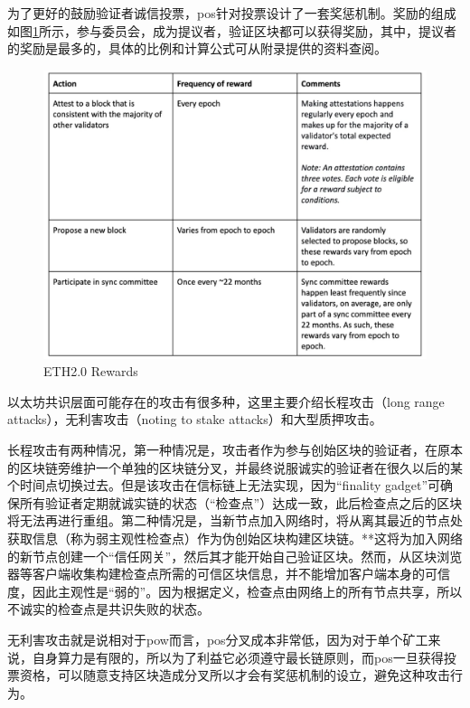 \documentclass[a4paper,twoside]{scrbook}
\begin{document}
\begin{CJK}{UTF8}{gbsn}
为了更好的鼓励验证者诚信投票，pos针对投票设计了一套奖惩机制。奖励的组成如图\ref{fig:reward}所示，参与委员会，成为提议者，验证区块都可以获得奖励，其中，提议者的奖励是最多的，具体的比例和计算公式可从附录提供的资料查阅。

\begin{figure}[!htbp]
\centering
\includegraphics[width=1\textwidth]{Figures/eth reward.png}
\caption{ETH2.0 Rewards} 
\label{fig:reward}
\end{figure}

以太坊共识层面可能存在的攻击有很多种，这里主要介绍长程攻击（long range attacks），无利害攻击（noting to stake attacks）和大型质押攻击。

长程攻击有两种情况，第一种情况是，攻击者作为参与创始区块的验证者，在原本的区块链旁维护一个单独的区块链分叉，并最终说服诚实的验证者在很久以后的某个时间点切换过去。但是该攻击在信标链上无法实现，因为“finality gadget”可确保所有验证者定期就诚实链的状态（“检查点”）达成一致，此后检查点之后的区块将无法再进行重组。第二种情况是，当新节点加入网络时，将从离其最近的节点处获取信息（称为弱主观性检查点）作为伪创始区块构建区块链。**这将为加入网络的新节点创建一个“信任网关”，然后其才能开始自己验证区块。然而，从区块浏览器等客户端收集构建检查点所需的可信区块信息，并不能增加客户端本身的可信度，因此主观性是“弱的”。因为根据定义，检查点由网络上的所有节点共享，所以不诚实的检查点是共识失败的状态。

无利害攻击就是说相对于pow而言，pos分叉成本非常低，因为对于单个矿工来说，自身算力是有限的，所以为了利益它必须遵守最长链原则，而pos一旦获得投票资格，可以随意支持区块造成分叉所以才会有奖惩机制的设立，避免这种攻击行为。


\end{CJK}
\end{document}
